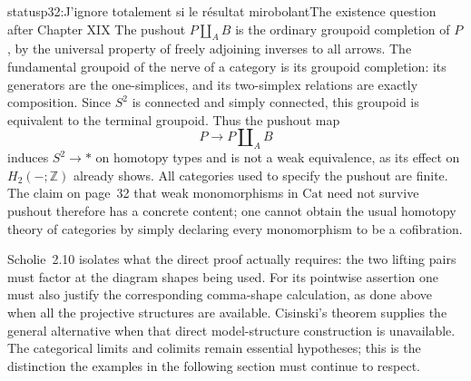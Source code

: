 \begin{dcomment}{status}{p32:J'ignore totalement si le résultat mirobolant}{The existence question after Chapter XIX}
The pushout $P\amalg_A B$ is the ordinary groupoid completion of $P$, by the universal property of freely adjoining inverses to all arrows. The fundamental groupoid of the nerve of a category is its groupoid completion: its generators are the one-simplices, and its two-simplex relations are exactly composition. Since $S^2$ is connected and simply connected, this groupoid is equivalent to the terminal groupoid. Thus the pushout map
\[
 P\longrightarrow P\amalg_A B
\]
induces $S^2\to *$ on homotopy types and is not a weak equivalence, as its effect on $H_2(-;\mathbb Z)$ already shows. All categories used to specify the pushout are finite. The claim on page~32 that weak monomorphisms in $\mathrm{Cat}$ need not survive pushout therefore has a concrete content; one cannot obtain the usual homotopy theory of categories by simply declaring every monomorphism to be a cofibration.

Scholie~2.10 isolates what the direct proof actually requires: the two lifting pairs must factor at the diagram shapes being used. For its pointwise assertion one must also justify the corresponding comma-shape calculation, as done above when all the projective structures are available. Cisinski's theorem supplies the general alternative when that direct model-structure construction is unavailable. The categorical limits and colimits remain essential hypotheses; this is the distinction the examples in the following section must continue to respect.
\end{dcomment}


